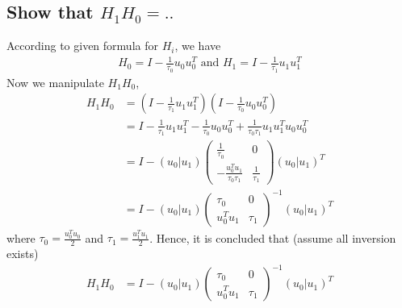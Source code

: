 \documentclass[11pt,a4paper]{article}
\begin{document}
\subsection{Show that $H_1 H_0 = ..$}
According to given formula for $H_i$, we have
\begin{align}
    H_0 = I - \frac{1}{\tau_0} u_0 u_0^T \text{ and }
    H_1 = I - \frac{1}{\tau_1} u_1 u_1^T
\end{align}
Now we manipulate $H_1 H_0$,
\begin{align}
    H_1 H_0 
    &= (I - \frac{1}{\tau_1} u_1 u_1^T) (I - \frac{1}{\tau_0} u_0 u_0^T) \\
    &= I - \frac{1}{\tau_1} u_1 u_1^T - \frac{1}{\tau_0} u_0 u_0^T  +
     \frac{1}{\tau_0\tau_1} u_1u_1^T u_0u_0^T \\
     &= I - (u_0 | u_1) 
     \left( \begin{array}{c|c} 
             \frac{1}{\tau_0} & 0 \\ \hline
             - \frac{u_0^T u_1}{\tau_0\tau_1} & \frac{1}{\tau_1}
         \end{array} \right)
     (u_0 | u_1)^T \\
     &= I - (u_0 | u_1) 
     \left( \begin{array}{c|c} 
             \tau_0 & 0 \\ \hline
              u_0^T u_1 & \tau_1
          \end{array} \right)^{-1}
     (u_0 | u_1)^T
\end{align}
where $\tau_0 = \frac{u_0^T u_0}{2}$ and $\tau_1 = \frac{u_1^T u_1}{2}$.
Hence, it is concluded that (assume all inversion exists)
\begin{align}
    H_1 H_0 &= I - (u_0 | u_1) 
     \left( \begin{array}{c|c} 
             \tau_0 & 0 \\ \hline
              u_0^T u_1 & \tau_1
          \end{array} \right)^{-1}
     (u_0 | u_1)^T
\end{align}
\end{document}
